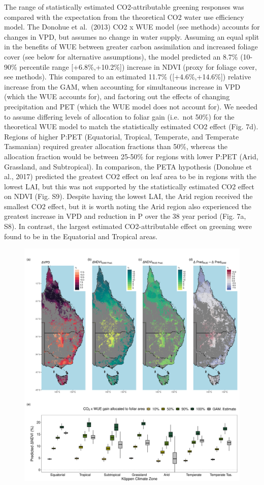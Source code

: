 \documentclass[gc, manuscript]{copernicus}
\begin{document}
The range of statistically estimated CO2-attributable greening responses
was compared with the expectation from the theoretical CO2 water use
efficiency model. The Donohue et al.~(2013) CO2 x WUE model (see
methods) accounts for changes in VPD, but assumes no change in water
supply. Assuming an equal split in the benefits of WUE between greater
carbon assimilation and increased foliage cover (see below for
alternative assumptions), the model predicted an 8.7\% (10-90\%
percentile range {[}+6.8\%,+10.2\%{]}) increase in NDVI (proxy for
foliage cover, see methods). This compared to an estimated 11.7\%
({[}+4.6\%,+14.6\%{]}) relative increase from the GAM, when accounting
for simultaneous increase in VPD (which the WUE accounts for), and
factoring out the effects of changing precipitation and PET (which the
WUE model does not account for). We needed to assume differing levels of
allocation to foliar gain (i.e.~not 50\%) for the theoretical WUE model
to match the statistically estimated CO2 effect (Fig. 7d). Regions of
higher P:PET (Equatorial, Tropical, Temperate, and Temperate Tasmanian)
required greater allocation fractions than 50\%, whereas the allocation
fraction would be between 25-50\% for regions with lower P:PET (Arid,
Grassland, and Subtropical). In comparison, the PETA hypothesis (Donohue
et al., 2017) predicted the greatest CO2 effect on leaf area to be in
regions with the lowest LAI, but this was not supported by the
statistically estimated CO2 effect on NDVI (Fig. S9). Despite having the
lowest LAI, the Arid region received the smallest CO2 effect, but it is
worth noting the Arid region also experienced the greatest increase in
VPD and reduction in P over the 38 year period (Fig. 7a, S8). In
contrast, the largest estimated CO2-attributable effect on greening were
found to be in the Equatorial and Tropical areas. \clearpage

\begin{figure}
\includegraphics[width=12cm]{../../figures/Fig7_map_dVpd_gamCO2Pred_wueCO2Pred_dDifferenceBoxplot} \end{figure}
\clearpage
\end{document}
